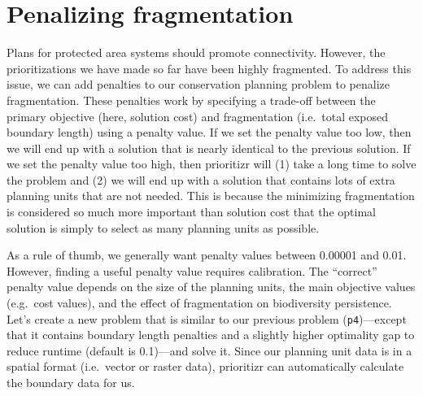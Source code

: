 \documentclass[12pt,]{book}
\newenvironment{Shaded}{\begin{snugshade}}{\end{snugshade}}
\newcommand{\KeywordTok}[1]{\textcolor[rgb]{0.13,0.29,0.53}{\textbf{#1}}}
\newcommand{\DataTypeTok}[1]{\textcolor[rgb]{0.13,0.29,0.53}{#1}}
\newcommand{\FloatTok}[1]{\textcolor[rgb]{0.00,0.00,0.81}{#1}}
\newcommand{\StringTok}[1]{\textcolor[rgb]{0.31,0.60,0.02}{#1}}
\newcommand{\CommentTok}[1]{\textcolor[rgb]{0.56,0.35,0.01}{\textit{#1}}}
\newcommand{\OperatorTok}[1]{\textcolor[rgb]{0.81,0.36,0.00}{\textbf{#1}}}
\newcommand{\NormalTok}[1]{#1}
\begin{document}
\section{Penalizing fragmentation}\label{penalizing-fragmentation}

Plans for protected area systems should promote connectivity. However,
the prioritizations we have made so far have been highly fragmented. To
address this issue, we can add penalties to our conservation planning
problem to penalize fragmentation. These penalties work by specifying a
trade-off between the primary objective (here, solution cost) and
fragmentation (i.e.~total exposed boundary length) using a penalty
value. If we set the penalty value too low, then we will end up with a
solution that is nearly identical to the previous solution. If we set
the penalty value too high, then prioritizr will (1) take a long time to
solve the problem and (2) we will end up with a solution that contains
lots of extra planning units that are not needed. This is because the
minimizing fragmentation is considered so much more important than
solution cost that the optimal solution is simply to select as many
planning units as possible.

As a rule of thumb, we generally want penalty values between 0.00001 and
0.01. However, finding a useful penalty value requires calibration. The
``correct'' penalty value depends on the size of the planning units, the
main objective values (e.g.~cost values), and the effect of
fragmentation on biodiversity persistence. Let's create a new problem
that is similar to our previous problem (\texttt{p4})---except that it
contains boundary length penalties and a slightly higher optimality gap
to reduce runtime (default is 0.1)---and solve it. Since our planning
unit data is in a spatial format (i.e.~vector or raster data),
prioritizr can automatically calculate the boundary data for us.

\clearpage

\begin{Shaded}
\end{Shaded}
\end{document}
